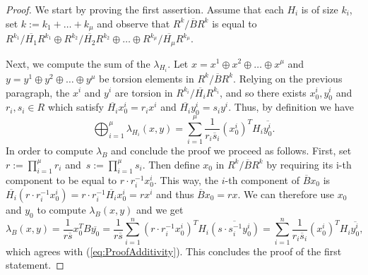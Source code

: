 \documentclass[11pt,a4paper]{amsart}
\theoremstyle{definition}
\begin{document}
\begin{proof}
We start by proving the first assertion. Assume that each $H_i$ is of size $k_i$, set $k:=k_1 + \ldots +k_\mu$ and observe that $R^k/\overline{B} R^k$ is equal to $R^{k_1} / \overline{H_1} R^{k_1} \oplus R^{k_2} / \overline{H_2} R^{k_2} \oplus \ldots \oplus R^{k_\mu} / \overline{H_\mu} R^{k_\mu}$. 

Next, we compute the sum of the $\lambda_{H_i}$. Let $x=x^1 \oplus x^2 \oplus \ldots \oplus x^\mu$ and $y=y^1 \oplus y^2 \oplus \ldots \oplus y^\mu$ be torsion elements in $R^k/\overline{B} R^k$. Relying on the previous paragraph, the $x^i$ and $y^i$ are torsion in $R^{k_i} / \overline{H_i} R^{k_i}$, and so there exists $x_0^i,y_0^i$ and $r_i,s_i \in R$ which satisfy $\overline{H_i} x_0^i=r_i x^i$ and $\overline{H_i} y_0^i=s_i y^i$. Thus, by definition we have
\begin{equation}
\label{eq:ProofAdditivity}
\bigoplus_{i=1}^\mu \lambda_{H_i}(x,y)= \sum_{i=1}^\mu \frac{1}{r_i\overline{s}_i}  (x_0^i)^T H_i \overline{y_0^i}.
 \end{equation}
In order to compute $\lambda_B$ and conclude the proof we proceed as follows. 
First, set $r:=\prod_{i=1}^\mu r_i$ and~$s:=\prod_{i=1}^\mu s_i$. Then define
$x_0$ in $R^k/\overline{B} R^k$ by requiring its i-th component to be equal to $r\cdot r_i^{-1} x_0^i$. 
This way, the $i$-th component of $\overline{B} x_0$ is $\overline{H_i} (r\cdot r_i^{-1} x_0^i)=r\cdot r_i^{-1} \overline{H_i} x_0^i=r x^i$ and thus $\overline{B} x_0=r x$. We can therefore use $x_0$ and $y_0$ to compute $\lambda_B(x,y)$ and we get 
$$ \lambda_B (x,y)=\frac{1}{r\overline{s}} x_0^T B \overline{y_0}=\frac{1}{r\overline{s}} \sum_{i=1}^n (r \cdot r_i^{-1} x_0^i)^T H_i \overline{(s \cdot s_i^{-1} y_0^i)}= \sum_{i=1}^n  \frac{1}{r_i\overline{s}_i}(x_0^i)^T H_i \overline{y_0^i},$$
which agrees with (\ref{eq:ProofAdditivity}). This concludes the proof of the first statement.


\end{proof}
\end{document}
